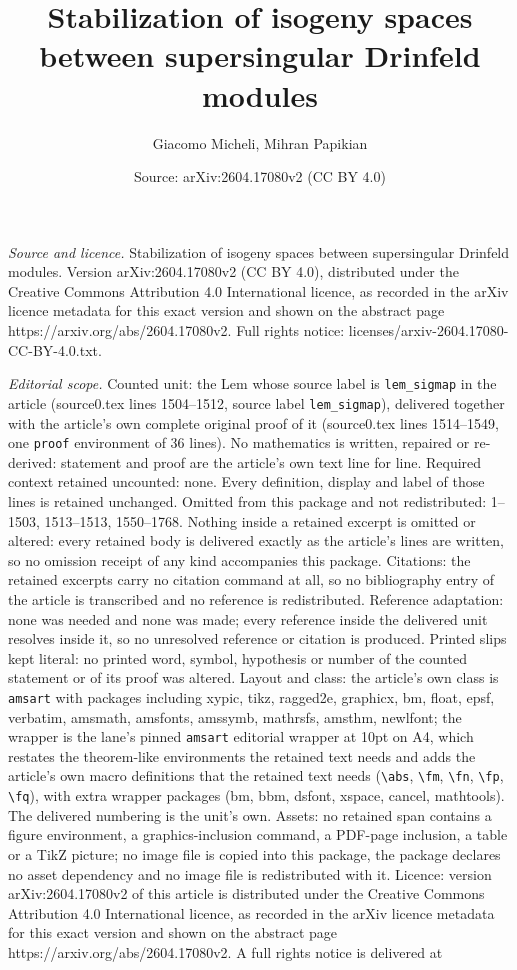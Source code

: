 \documentclass[10pt,a4paper]{amsart}
\title[Stabilization of isogeny spaces between supersingular Drinfe]{Stabilization of isogeny spaces between supersingular Drinfeld modules}
\author{Giacomo Micheli, Mihran Papikian}
\date{Source: arXiv:2604.17080v2 (CC BY 4.0)}
\begin{document}
\maketitle

\noindent\emph{Source and licence.} Stabilization of isogeny spaces between supersingular Drinfeld modules. Version arXiv:2604.17080v2 (CC BY 4.0), distributed under the Creative Commons Attribution 4.0 International licence, as recorded in the arXiv licence metadata for this exact version and shown on the abstract page https://arxiv.org/abs/2604.17080v2. Full rights notice: licenses/arxiv-2604.17080-CC-BY-4.0.txt.\par\smallskip

\noindent\textit{Editorial scope.} Counted unit: the Lem whose source label is \texttt{lem\_sigmap} in the article (source0.tex lines 1504--1512, source label \texttt{lem\_sigmap}), delivered together with the article's own complete original proof of it (source0.tex lines 1514--1549, one \texttt{proof} environment of 36 lines). No mathematics is written, repaired or re-derived: statement and proof are the article's own text line for line. Required context retained uncounted: none. Every definition, display and label of those lines is retained unchanged. Omitted from this package and not redistributed: 1--1503, 1513--1513, 1550--1768. Nothing inside a retained excerpt is omitted or altered: every retained body is delivered exactly as the article's lines are written, so no omission receipt of any kind accompanies this package. Citations: the retained excerpts carry no citation command at all, so no bibliography entry of the article is transcribed and no reference is redistributed. Reference adaptation: none was needed and none was made; every reference inside the delivered unit resolves inside it, so no unresolved reference or citation is produced. Printed slips kept literal: no printed word, symbol, hypothesis or number of the counted statement or of its proof was altered. Layout and class: the article's own class is \texttt{amsart} with packages including xypic, tikz, ragged2e, graphicx, bm, float, epsf, verbatim, amsmath, amsfonts, amssymb, mathrsfs, amsthm, newlfont; the wrapper is the lane's pinned \texttt{amsart} editorial wrapper at 10pt on A4, which restates the theorem-like environments the retained text needs and adds the article's own macro definitions that the retained text needs (\texttt{\textbackslash abs}, \texttt{\textbackslash fm}, \texttt{\textbackslash fn}, \texttt{\textbackslash fp}, \texttt{\textbackslash fq}), with extra wrapper packages (bm, bbm, dsfont, xspace, cancel, mathtools). The delivered numbering is the unit's own. Assets: no retained span contains a figure environment, a graphics-inclusion command, a PDF-page inclusion, a table or a TikZ picture; no image file is copied into this package, the package declares no asset dependency and no image file is redistributed with it. Licence: version arXiv:2604.17080v2 of this article is distributed under the Creative Commons Attribution 4.0 International licence, as recorded in the arXiv licence metadata for this exact version and shown on the abstract page https://arxiv.org/abs/2604.17080v2. A full rights notice is delivered at 
\end{document}
